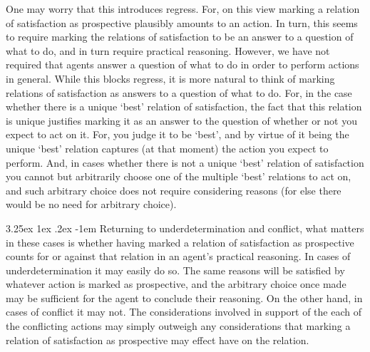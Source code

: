 \documentclass[10pt]{article}
\makeatletter
\renewcommand\paragraph{\@startsection{paragraph}{5}{\z@}%
  {3.25ex \@plus1ex \@minus.2ex}%
  {-1em}%
  {\normalfont\normalsize\bfseries}}
\makeatother
\begin{document}
One may worry that this introduces regress.
For, on this view marking a relation of satisfaction as prospective plausibly amounts to an action.
In turn, this seems to require marking the relations of satisfaction to be an answer to a question of what to do, and in turn require practical reasoning.
However, we have not required that agents answer a question of what to do in order to perform actions in general.
While this blocks regress, it is more natural to think of marking relations of satisfaction as answers to a question of what to do.
For, in the case whether there is a unique `best' relation of satisfaction, the fact that this relation is unique justifies marking it as an answer to the question of whether or not you expect to act on it.
For, you judge it to be `best', and by virtue of it being the unique `best' relation captures (at that moment) the action you expect to perform.
And, in cases whether there is not a unique `best' relation of satisfaction you cannot but arbitrarily choose one of the multiple `best' relations to act on, and such arbitrary choice does not require considering reasons (for else there would be no need for arbitrary choice).

\paragraph{ } %
Returning to underdetermination and conflict, what matters in these cases is whether having marked a relation of satisfaction as prospective counts for or against that relation in an agent's practical reasoning.
In cases of underdetermination it may easily do so.
The same reasons will be satisfied by whatever action is marked as prospective, and the arbitrary choice once made may be sufficient for the agent to conclude their reasoning.
On the other hand, in cases of conflict it may not.
The considerations involved in support of the each of the conflicting actions may simply outweigh any considerations that marking a relation of satisfaction as prospective may effect have on the relation.
\end{document}
